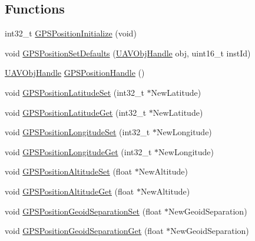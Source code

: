 \subsection*{\-Functions}
\begin{DoxyCompactItemize}
\item 
int32\-\_\-t \hyperlink{group___g_p_s_position_ga7c40b2714db6dcbd1937ad9ce85f6612}{\-G\-P\-S\-Position\-Initialize} (void)
\item 
void \hyperlink{group___g_p_s_position_ga14946013aa5fe09ca55079e9c88ea629}{\-G\-P\-S\-Position\-Set\-Defaults} (\hyperlink{targets_2_u_a_v_objects_2inc_2uavobjectmanager_8h_a279053e22be53ce9f895043aaeb91e3b}{\-U\-A\-V\-Obj\-Handle} obj, uint16\-\_\-t inst\-Id)
\item 
\hyperlink{targets_2_u_a_v_objects_2inc_2uavobjectmanager_8h_a279053e22be53ce9f895043aaeb91e3b}{\-U\-A\-V\-Obj\-Handle} \hyperlink{group___g_p_s_position_gaf745ba3b057fb0283a1a95a7f4630e29}{\-G\-P\-S\-Position\-Handle} ()
\item 
void \hyperlink{group___g_p_s_position_gaf0eed96bdb8c312ccc2572390ffbef37}{\-G\-P\-S\-Position\-Latitude\-Set} (int32\-\_\-t $\ast$\-New\-Latitude)
\item 
void \hyperlink{group___g_p_s_position_gaabaafd5f7c0e7c358c83ebded96a21a5}{\-G\-P\-S\-Position\-Latitude\-Get} (int32\-\_\-t $\ast$\-New\-Latitude)
\item 
void \hyperlink{group___g_p_s_position_ga5289c38e3740822f458f2bef6abaeac2}{\-G\-P\-S\-Position\-Longitude\-Set} (int32\-\_\-t $\ast$\-New\-Longitude)
\item 
void \hyperlink{group___g_p_s_position_ga18bde69cfea55136fa17b0f6349a9dc1}{\-G\-P\-S\-Position\-Longitude\-Get} (int32\-\_\-t $\ast$\-New\-Longitude)
\item 
void \hyperlink{group___g_p_s_position_ga42960da63325c559078924efabab04da}{\-G\-P\-S\-Position\-Altitude\-Set} (float $\ast$\-New\-Altitude)
\item 
void \hyperlink{group___g_p_s_position_gaacba1fe78ef01e6167628cdec87e448f}{\-G\-P\-S\-Position\-Altitude\-Get} (float $\ast$\-New\-Altitude)
\item 
void \hyperlink{group___g_p_s_position_ga7e53c86b213ff8ef84f9b1ecc9f13727}{\-G\-P\-S\-Position\-Geoid\-Separation\-Set} (float $\ast$\-New\-Geoid\-Separation)
\item 
void \hyperlink{group___g_p_s_position_ga196c8b3e816118b0dd4878ec8a286486}{\-G\-P\-S\-Position\-Geoid\-Separation\-Get} (float $\ast$\-New\-Geoid\-Separation)
\item 

\end{DoxyCompactItemize}
